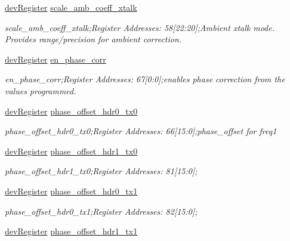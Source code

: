 \begin{DoxyCompactItemize}
\mbox{\hyperlink{classdev_register}{dev\+Register}} \mbox{\hyperlink{class_o_p_t3101_registers_adc47c94293601428c20e2422082b4969}{scale\+\_\+amb\+\_\+coeff\+\_\+xtalk}}
\begin{DoxyCompactList}\small\item\em scale\+\_\+amb\+\_\+coeff\+\_\+xtalk;Register Addresses\+: 58\mbox{[}22\+:20\mbox{]};Ambient xtalk mode. Provides range/precision for ambient correction. \end{DoxyCompactList}\item 
\mbox{\hyperlink{classdev_register}{dev\+Register}} \mbox{\hyperlink{class_o_p_t3101_registers_a708f5d3ac94ad4fa314d42ad42026a14}{en\+\_\+phase\+\_\+corr}}
\begin{DoxyCompactList}\small\item\em en\+\_\+phase\+\_\+corr;Register Addresses\+: 67\mbox{[}0\+:0\mbox{]};enables phase correction from the values programmed. \end{DoxyCompactList}\item 
\mbox{\hyperlink{classdev_register}{dev\+Register}} \mbox{\hyperlink{class_o_p_t3101_registers_a5804a3c0838fea34edc5e30405891e4f}{phase\+\_\+offset\+\_\+hdr0\+\_\+tx0}}
\begin{DoxyCompactList}\small\item\em phase\+\_\+offset\+\_\+hdr0\+\_\+tx0;Register Addresses\+: 66\mbox{[}15\+:0\mbox{]};phase\+\_\+offset for freq1 \end{DoxyCompactList}\item 
\mbox{\hyperlink{classdev_register}{dev\+Register}} \mbox{\hyperlink{class_o_p_t3101_registers_af64b9a5c99582c83b7c3a546f9d14588}{phase\+\_\+offset\+\_\+hdr1\+\_\+tx0}}
\begin{DoxyCompactList}\small\item\em phase\+\_\+offset\+\_\+hdr1\+\_\+tx0;Register Addresses\+: 81\mbox{[}15\+:0\mbox{]}; \end{DoxyCompactList}\item 
\mbox{\hyperlink{classdev_register}{dev\+Register}} \mbox{\hyperlink{class_o_p_t3101_registers_a89870d39539bdf21a2098e1b8a760d81}{phase\+\_\+offset\+\_\+hdr0\+\_\+tx1}}
\begin{DoxyCompactList}\small\item\em phase\+\_\+offset\+\_\+hdr0\+\_\+tx1;Register Addresses\+: 82\mbox{[}15\+:0\mbox{]}; \end{DoxyCompactList}\item 
\mbox{\hyperlink{classdev_register}{dev\+Register}} \mbox{\hyperlink{class_o_p_t3101_registers_adf6ef0727836549e6ef48efb0fa21f45}{phase\+\_\+offset\+\_\+hdr1\+\_\+tx1}}

\end{DoxyCompactItemize}
